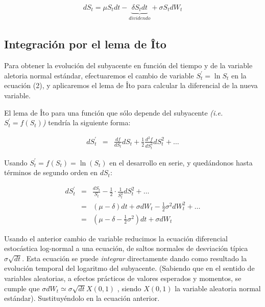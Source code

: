 \documentclass[12pt]{article}
\begin{document}
\begin{eqnarray}
	dS_{t} = \mu S_{t}dt - \underbrace{\delta S_{t}dt}_{dividendo} + \sigma S_{t}dW_{t}
\end{eqnarray}

\subsection{Integraci\'{o}n por el lema de \^{I}to}

Para obtener la evoluci\'{o}n del subyacente en funci\'{o}n del tiempo y de la variable aletoria normal est\'{a}ndar,
efectuaremos el cambio de variable $S^{'}_{t}=\ln S_{t}$ en la ecuaci\'{o}n (2), y aplicaremos el lema de \^{I}to para 
calcular la diferencial de la nueva variable.
\newline

El lema de \^{I}to para una funci\'{o}n que s\'{o}lo depende del subyacente {\em (i.e.\ $S_{t}^{'}=f(S_{t})$)} tendr\'{i}a
la siguiente forma:
\newline

\begin{eqnarray}
	dS_{t}^{'} & = & \frac{df}{dS_{t}}dS_{t} + \frac{1}{2}\frac{d^{2}f}{dS_{t}^{2}}dS_{t}^{2} + \ldots
\end{eqnarray} 

Usando $S_{t}^{'} = f(S_{t}) = \ln(S_{t})$ en el desarrollo en serie, y qued\'{a}ndonos hasta t\'{e}rminos de segundo orden en $dS_{t}$:
\newline

\begin{eqnarray}
	dS_{t}^{'}	& = & \frac{dS_{t}}{S_{t}} - \frac{1}{2}\cdot\frac{1}{S_{t}^{2}}dS_{t}^{2} + \ldots \nonumber \\
			& = & \left( \mu - \delta \right) dt + \sigma dW_{t} - \frac{1}{2}\sigma^{2}dW_{t}^{2} + \ldots \nonumber \\
			& = & \left( \mu - \delta - \frac{1}{2}\sigma^{2} \right)dt + \sigma dW_{t} 		 
\end{eqnarray}

Usando el anterior cambio de variable reducimos la ecuaci\'{o}n diferencial estoc\'{a}stica log-normal a una ecuaci\'{o}n, de saltos normales de
desviaci\'{o}n t\'{i}pica $\sigma \sqrt{dt}$. Esta ecuaci\'{o}n se puede {\em integrar} directamente dando como resultado la evoluci\'{o}n
temporal del logaritmo del subyacente. (Sabiendo que en el sentido de variables aleatorias, a efectos pr\'{a}cticos de valores esperados y momentos, se cumple que $\sigma dW_{t} \simeq \sigma \sqrt{dt} X \left( 0,1 \right)$ , siendo 
$ X \left( 0, 1 \right)$ la variable aleatoria normal est\'{a}ndar). Sustituy\'{e}ndolo en la ecuaci\'{o}n anterior.
\newline
\end{document}
